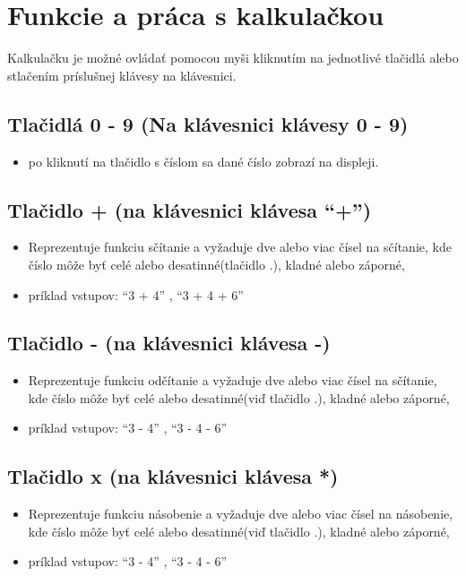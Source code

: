 \documentclass[a4paper, 11pt]{article}
\begin{document}
    \newpage
    
    \section{Funkcie a práca s kalkulačkou}
        Kalkulačku je možné ovládať pomocou myši kliknutím na jednotlivé tlačidlá alebo stlačením príslušnej klávesy na klávesnici.
        
        \subsection{Tlačidlá 0 - 9 (Na klávesnici klávesy 0 - 9)}
        \begin{itemize}
            \item po kliknutí na tlačidlo s číslom sa dané číslo zobrazí na displeji.
        \end{itemize}
        
        \subsection{Tlačidlo + (na klávesnici klávesa “+”)}
        \begin{itemize}
            \item Reprezentuje funkciu sčítanie a vyžaduje dve alebo viac čísel na sčítanie, kde číslo môže byť celé alebo desatinné(tlačidlo .), kladné alebo záporné,
            \item príklad vstupov:  “3 + 4” , “3 + 4 + 6”
            
        \end{itemize}
        
         \subsection{Tlačidlo - (na klávesnici klávesa -)}
        \begin{itemize}
            \item Reprezentuje funkciu odčítanie a vyžaduje dve alebo viac čísel na sčítanie, kde číslo môže byť celé alebo desatinné(viď tlačidlo .), kladné alebo záporné,
            \item príklad vstupov:  “3 - 4” , “3 - 4 - 6”
        \end{itemize}
        
         \subsection{Tlačidlo x (na klávesnici klávesa *)}
        \begin{itemize}
            \item Reprezentuje funkciu násobenie a vyžaduje dve alebo viac čísel na násobenie, kde číslo môže byť celé alebo desatinné(viď tlačidlo .), kladné alebo záporné,
            \item príklad vstupov:  “3 - 4” , “3 - 4 - 6”
        \end{itemize}
        
\end{document}
